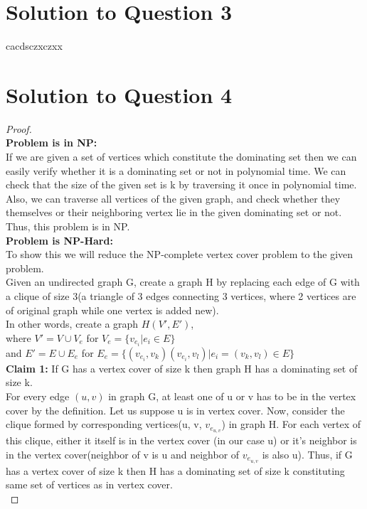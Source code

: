 \documentclass[11pt]{article}
\begin{document}
\section{Solution to Question 3}
cacdsczxczxx

\newpage
\section{Solution to Question 4}
\begin{proof}\\
  \textbf{Problem is in NP:} \\
   If we are given a set of vertices which constitute the dominating set then we can easily verify whether it is a dominating set or not in polynomial time. We can check that the size of the given set is k by traversing it once in polynomial time. Also, we can traverse all vertices of the given graph, and check whether they themselves or their neighboring vertex lie in the given dominating set or not.
   Thus, this problem is in NP. \\
  \textbf{Problem is NP-Hard:} \\
   To show this we will reduce the NP-complete vertex cover problem to the given problem. \\
   Given an undirected graph G, create a graph H by replacing each edge of G with a clique of size 3(a triangle of 3 edges connecting 3 vertices, where 2 vertices are of original graph while one vertex is added new).\\ In other words, create a graph $H(V', E')$, \\ where $V' = V \cup V_e$ for $V_e = \{v_{e_i}|e_i \in E\}$ \\
   and $E' = E \cup E_e$ for $E_e = \{(v_{e_i},v_k)(v_{e_i},v_l)|e_i = (v_k, v_l) \in E\}$ \\
   \textbf{Claim 1:} If G has a vertex cover of size k then graph H has a dominating set of size k. \\
   For every edge $(u, v)$ in graph G, at least one of u or v has to be in the vertex cover by the definition. Let us suppose u is in vertex cover. Now, consider the clique formed by corresponding vertices(u, v, $v_{e_{u,v}}$) in graph H. For each vertex of this clique, either it itself is in the vertex cover (in our case u) or it's neighbor is in the vertex cover(neighbor of v is u and neighbor of $v_{e_{u,v}}$ is also u). Thus, if G has a vertex cover of size k then H has a dominating set of size k constituting same set of vertices as in vertex cover.\\  

\end{proof}
\end{document}
